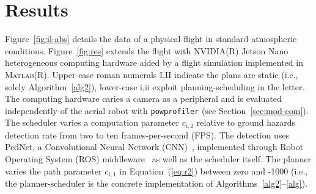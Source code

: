 \documentclass[letterpaper,10pt,journal,twoside]{IEEEtran}
\newcommand{\stt}[1]{{\small\tt #1}} %
\newcommand{\powprof}{\stt{powprofiler}}
\theoremstyle{definition}
\begin{document}
\section{Results}         %
\label{sec:experimental}  %


Figure~\ref{fig:il-abs} details the data of a physical flight  
in standard atmospheric conditions. 
Figure~\ref{fig:res} extends the flight with NVIDIA\hspace{.5ex}(R) Jetson Nano heterogeneous computing hardware aided by a flight simulation implemented in \textsc{Matlab}\hspace{.5ex}(R). 
Upper-case roman numerals I,II indicate the plans are static (i.e., solely Algorithm~\ref{alg2}), lower-case i,ii exploit planning-scheduling in the letter.
The computing hardware caries a camera as a peripheral and is evaluated independently of the aerial robot with \powprof{} (see Section~\ref{sec:mod-com}). The scheduler varies a computation parameter $c_{i,2}$ relative to ground hazards detection rate from two to ten frames-per-second (FPS). The detection uses PedNet, a Convolutional Neural Network (CNN)~\cite{ullah2018pednet}, implemented through Robot Operating System (ROS) middleware~\cite{quigley2009ros} as well as the scheduler itself. The planner varies the path parameter $c_{i,1}$ in Equation~(\ref{eq:r2}) between zero and -1000 (i.e., the planner-scheduler is the concrete implementation of Algorithms~\ref{alg2}--\ref{alg}).


\end{document}
